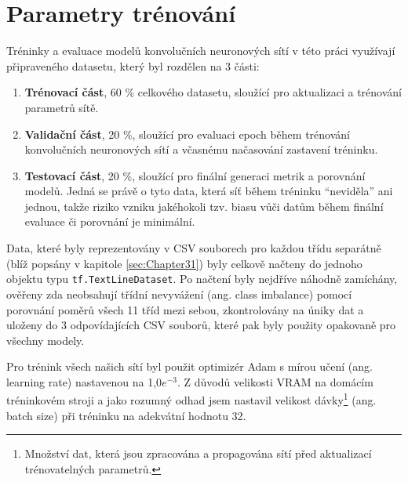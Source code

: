 \section{Parametry trénování}
\label{sec:Chapter53}
Tréninky a evaluace modelů konvolučních neuronových sítí v této práci využívají připraveného datasetu, který byl rozdělen na 3 části:
\begin{enumerate}
    \item \textbf{Trénovací část}, 60 \% celkového datasetu, sloužící pro aktualizaci a trénování parametrů sítě.
    \item \textbf{Validační část}, 20 \%, sloužící pro evaluaci epoch během trénování konvolučních neuronových sítí a včasnému načasování zastavení tréninku.
    \item \textbf{Testovací část}, 20 \%, sloužící pro finální generaci metrik a porovnání modelů. Jedná se právě o tyto data, která síť během tréninku \enquote{neviděla} ani jednou, takže riziko vzniku jakéhokoli tzv. biasu vůči datům během finální evaluace či porovnání je minimální.
\end{enumerate}

Data, které byly reprezentovány v CSV souborech pro každou třídu separátně (blíž popsány v kapitole \ref{sec:Chapter31}) byly celkově načteny do jednoho objektu typu \texttt{tf.TextLineDataset}. Po načtení byly nejdříve náhodně zamíchány, ověřeny zda neobsahují třídní nevyvážení (ang. class imbalance) pomocí porovnání poměrů všech 11 tříd mezi sebou, zkontrolovány na úniky dat a uloženy do 3 odpovídajících CSV souborů, které pak byly použity opakovaně pro všechny modely.

Pro trénink všech našich sítí byl použit optimizér Adam s mírou učení (ang. learning rate) nastavenou na 1,0$e^{-3}$. Z důvodů velikosti VRAM na domácím tréninkovém stroji a jako rozumný odhad jsem nastavil velikost dávky\footnote{Množství dat, která jsou zpracována a propagována sítí před aktualizací trénovatelných parametrů.} (ang. batch size) při tréninku na adekvátní hodnotu 32.

\endinput